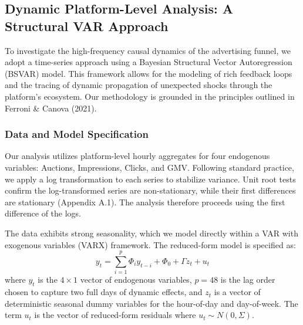 \subsection{Dynamic Platform-Level Analysis: A Structural VAR Approach}
To investigate the high-frequency causal dynamics of the advertising funnel, we adopt a time-series approach using a Bayesian Structural Vector Autoregression (BSVAR) model. This framework allows for the modeling of rich feedback loops and the tracing of dynamic propagation of unexpected shocks through the platform's ecosystem. Our methodology is grounded in the principles outlined in Ferroni & Canova (2021).

\subsubsection{Data and Model Specification}
Our analysis utilizes platform-level hourly aggregates for four endogenous variables: Auctions, Impressions, Clicks, and GMV. Following standard practice, we apply a log transformation to each series to stabilize variance. Unit root tests confirm the log-transformed series are non-stationary, while their first differences are stationary (Appendix A.1). The analysis therefore proceeds using the first difference of the logs.

The data exhibits strong seasonality, which we model directly within a VAR with exogenous variables (VARX) framework. The reduced-form model is specified as:
\begin{equation}
    y_t = \sum_{i=1}^{p} \Phi_i y_{t-i} + \Phi_0 + \Gamma z_t + u_t
\end{equation}
where $y_t$ is the $4 \times 1$ vector of endogenous variables, $p=48$ is the lag order chosen to capture two full days of dynamic effects, and $z_t$ is a vector of deterministic seasonal dummy variables for the hour-of-day and day-of-week. The term $u_t$ is the vector of reduced-form residuals where $u_t \sim N(0, \Sigma)$.

